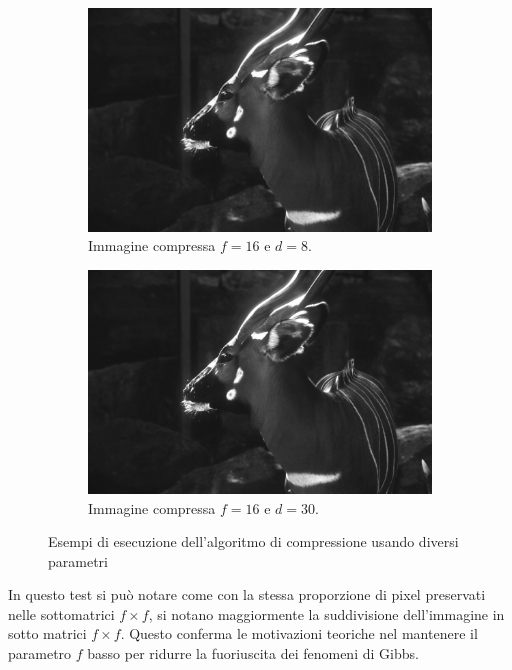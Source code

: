 \begin{figure}[!ht]
\begin{subfigure}[!ht]{0.45\textwidth}
        \includegraphics[width=\textwidth]{Progetto_2/img/f16d8.png}
        \caption{Immagine compressa $f = 16$ e $d = 8$.}
    \end{subfigure}
    \begin{subfigure}[!ht]{0.45\textwidth}
        \includegraphics[width=\textwidth]{Progetto_2/img/f16d30.png}
        \caption{Immagine compressa $f = 16$ e $d = 30$.}
    \end{subfigure}
    \caption{Esempi di esecuzione dell'algoritmo di compressione usando diversi 
    parametri}
    \label{fig:compress2}
\end{figure}

In questo test si può notare come con la stessa proporzione di 
pixel preservati nelle sottomatrici $f\times f$, si notano maggiormente la suddivisione 
dell'immagine in sotto matrici $f\times f$. Questo conferma le motivazioni 
teoriche nel mantenere il parametro $f$ basso per ridurre la fuoriuscita dei 
fenomeni di Gibbs.